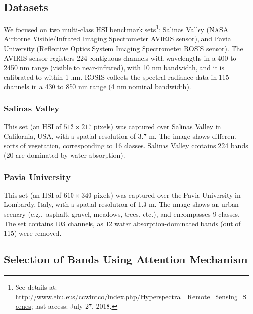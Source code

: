 \documentclass[journal]{IEEEtran}
\begin{document}
\subsection{Datasets}\label{sec:datasets}

We focused on two multi-class HSI benchmark sets\footnote{See details at: \url{http://www.ehu.eus/ccwintco/index.php/Hyperspectral_Remote_Sensing_Scenes}; last access: July 27, 2018.}: Salinas Valley (NASA Airborne Visible/Infrared Imaging Spectrometer AVIRIS sensor), and Pavia University (Reflective Optics System Imaging Spectrometer ROSIS sensor). The AVIRIS sensor registers 224 contiguous channels with wavelengths in a 400 to 2450 nm range (visible to near-infrared), with 10 nm bandwidth, and it is calibrated to within 1 nm. ROSIS collects the spectral radiance data in 115 channels in a 430 to 850 nm range (4 nm nominal bandwidth).

\subsubsection{Salinas Valley}

This set (an HSI of $512\times 217$ pixels) was captured over Salinas Valley in California, USA, with a spatial resolution of 3.7 m. The image shows different sorts of vegetation, corresponding to 16 classes. Salinas Valley contains 224 bands (20 are dominated by water absorption).


\subsubsection{Pavia University}

This set (an HSI of $610\times 340$ pixels) was captured over the Pavia University in Lombardy, Italy, with a spatial resolution of 1.3 m. The image shows an urban scenery (e.g.,~asphalt, gravel, meadows, trees, etc.), and encompasses 9 classes. The set contains 103 channels, as 12 water absorption-dominated bands (out of 115) were removed.


\subsection{Selection of Bands Using Attention Mechanism}
\end{document}
